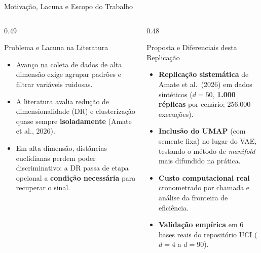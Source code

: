 \documentclass[aspectratio=169,11pt]{beamer}
\begin{document}
\begin{frame}{Motivação, Lacuna e Escopo do Trabalho}
  \begin{columns}[T]
    \begin{column}{0.49\textwidth}
      \begin{block}{Problema e Lacuna na Literatura}
        \begin{itemize}
          \item Avanço na coleta de dados de alta dimensão exige agrupar padrões
                e filtrar variáveis ruidosas.
          \item A literatura avalia redução de dimensionalidade (DR) e
                clusterização quase sempre \textbf{isoladamente}
                (Amate et al., 2026).
          \item Em alta dimensão, distâncias euclidianas perdem poder
                discriminativo: a DR passa de etapa opcional a \textbf{condição
                necessária} para recuperar o sinal.
        \end{itemize}
      \end{block}
    \end{column}
    \begin{column}{0.48\textwidth}
      \begin{block}{Proposta e Diferenciais desta Replicação}
        \begin{itemize}
          \item \textbf{Replicação sistemática} de Amate et al.\ (2026) em
                dados sintéticos ($d = 50$, \textbf{1{.}000 réplicas} por
                cenário; 256{.}000 execuções).
          \item \textbf{Inclusão do UMAP} (com semente fixa) no lugar do VAE,
                testando o método de \textit{manifold} mais difundido na prática.
          \item \textbf{Custo computacional real} cronometrado por chamada e
                análise da fronteira de eficiência.
          \item \textbf{Validação empírica} em 6 bases reais do repositório UCI
                ($d = 4$ a $d = 90$).
        \end{itemize}
      \end{block}
    \end{column}
  \end{columns}
\end{frame}
\end{document}
